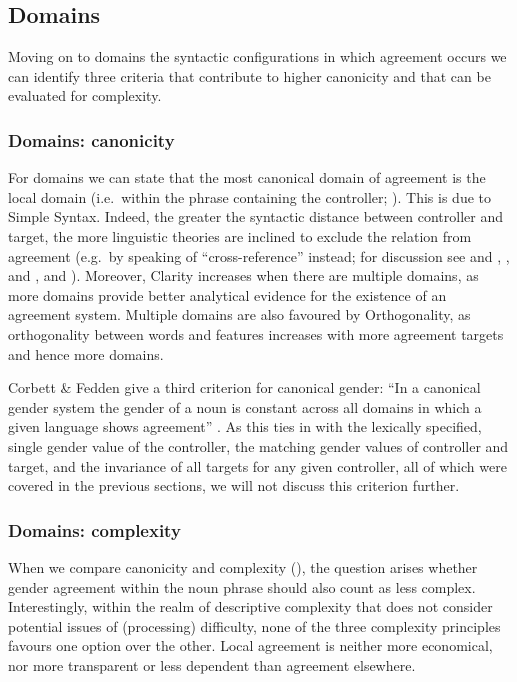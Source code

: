 \documentclass[output=collectionpaper]{langsci/langscibook}
\begin{document}
\subsection{Domains}
\label{sec:Audr:3.5}

Moving on to domains \textendash{} the syntactic configurations in which agreement occurs \textendash{} we can identify three criteria that contribute to higher canonicity and that can be evaluated for complexity.

\subsubsection{Domains: canonicity}

For domains we can state that the most canonical domain of agreement is the local domain (i.e.\ within the phrase containing the controller; \citealt[21]{Corbett2006}). This is due to Simple Syntax. Indeed, the greater the syntactic distance between controller and target, the more linguistic theories are inclined to exclude the relation from agreement (e.g.\ by speaking of ``cross-reference'' instead; for discussion see \citealt{Barlow1991} and \citealt[134--152]{Barlow1992}, \citealt{Corbett1991}, \citeyear{Corbett2001} and \citeyear{Corbett2006}, and \citealt{Siewierska1999}). Moreover, Clarity increases when there are multiple domains, as more domains provide better analytical evidence for the existence of an agreement system. Multiple domains are also favoured by Orthogonality, as orthogonality between words and features increases with more agreement targets and hence more domains.

Corbett \& Fedden give a third criterion for canonical gender: ``In a canonical gender system the gender of a noun is constant across all domains in which a given language shows agreement'' \citep[517]{Corbett2016}. As this ties in with the lexically specified, single gender value of the controller, the matching gender values of controller and target, and the invariance of all targets for any given controller, all of which were covered in the previous sections, we will not discuss this criterion further.

\subsubsection{Domains: complexity}

When we compare canonicity and complexity (), the question arises whether gender agreement within the noun phrase should also count as less complex. Interestingly, within the realm of descriptive complexity that does not consider potential issues of (processing) difficulty, none of the three complexity principles favours one option over the other. Local agreement is neither more economical, nor more transparent or less dependent than agreement elsewhere.
\end{document}
